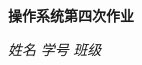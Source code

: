 \begin{center}
  \LARGE \bf 操作系统第四次作业
\end{center}

\begin{center}
  \emph{姓名} \underline{\makebox[7em][c]{\name}}
  \emph{学号} \underline{\makebox[12em][c]{\studentNum}}
  \emph{班级} \underline{\makebox[15em][c]{\class}}\\
\end{center}
